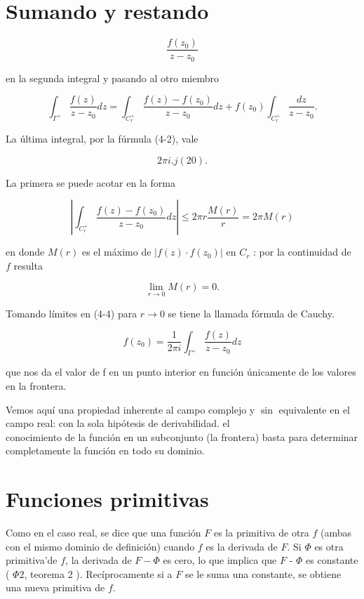 \documentclass[10pt]{article}
\theoremstyle{plain}
\theoremstyle{definition}
\theoremstyle{remark}
\begin{document}
\section*{Sumando y restando}
$$
\frac{f\left(z_{0}\right)}{z-z_{0}}
$$

en la segunda integral y pasando al otro miembro


\begin{equation*}
\int_{\Gamma^{+}} \frac{f(z)}{z-z_{0}} d z=\int_{C_{r}^{+}} \frac{f(z)-f\left(z_{0}\right)}{z-z_{0}} d z+f\left(z_{0}\right) \int_{C_{r}^{+}} \frac{d z}{z-z_{0}} . \tag{4-4}
\end{equation*}


La última integral, por la fúrmula (4-2), vale

$$
2 \pi i . j(20) .
$$

La primera se puede acotar en la forma

$$
\left|\int_{C_{r}^{+}} \frac{f(z)-f\left(z_{0}\right)}{z-z_{0}} d z\right| \leqslant 2 \pi r \frac{M(r)}{r}=2 \pi M(r)
$$

en donde $M(r)$ es el máximo de $\left|f(z) \cdot f\left(z_{0}\right)\right|$ en $C_{r}$ : por la continuidad de $f$ resulta

$$
\lim _{r \rightarrow 0} M(r)=0 .
$$

Tomando límites en (4-4) para $r \rightarrow 0$ se tiene la llamada fórmula de Cauchy.


\begin{equation*}
f\left(z_{0}\right)=\frac{1}{2 \pi i} \int_{\Gamma^{+}} \frac{f(z)}{z-z_{0}} d z \tag{45}
\end{equation*}


que nos da el valor de f en un punto interior en función únicamente de los valores en la frontera.

Vemos aquí una propiedad inherente al campo complejo y $\sin$ equivalente en el campo real: con la sola hipótesis de derivabilidad. el\\
conocimiento de la función en un subconjunto (la frontera) basta para determinar completamente la función en todo su dominio.

\section{Funciones primitivas}
Como en el caso real, se dice que una función $F$ es la primitiva de otra $f$ (ambas con el mismo dominio de definición) cuando $f$ es la derivada de $F$. Si $\Phi$ es otra primitiva'de $f$, la derivada de $F-\Phi$ es cero, lo que implica que $F$ - $\Phi$ es constante ( $\Phi 2$, teorema 2 ). Recíprocamente si a $F$ se le suma una constante, se obtiene una nueva primitiva de $f$.
\end{document}
